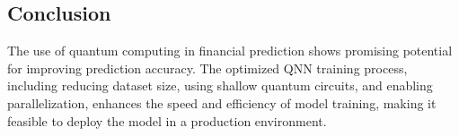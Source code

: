 \documentclass[12pt]{article}
\begin{document}
\begin{multicols}{2}
\section{Conclusion}
The use of quantum computing in financial prediction shows promising potential for improving prediction accuracy. The optimized QNN training process, including reducing dataset size, using shallow quantum circuits, and enabling parallelization, enhances the speed and efficiency of model training, making it feasible to deploy the model in a production environment.

\end{multicols}
\end{document}
